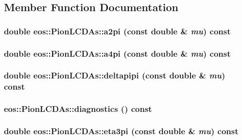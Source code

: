 \subsection{Member Function Documentation}
\hypertarget{classeos_1_1PionLCDAs_a4daa8e6632fb5ad61c13f7a7c4a91bbf}{
\subsubsection[{a2pi}]{\setlength{\rightskip}{0pt plus 5cm}double eos::PionLCDAs::a2pi (const double \& {\em mu}) const}}
\label{classeos_1_1PionLCDAs_a4daa8e6632fb5ad61c13f7a7c4a91bbf}
\hypertarget{classeos_1_1PionLCDAs_a0d0c446b70ca3078a36d064ffe5ae46c}{
\subsubsection[{a4pi}]{\setlength{\rightskip}{0pt plus 5cm}double eos::PionLCDAs::a4pi (const double \& {\em mu}) const}}
\label{classeos_1_1PionLCDAs_a0d0c446b70ca3078a36d064ffe5ae46c}
\hypertarget{classeos_1_1PionLCDAs_a605c4669795addc7a36752f6c07571e4}{
\subsubsection[{deltapipi}]{\setlength{\rightskip}{0pt plus 5cm}double eos::PionLCDAs::deltapipi (const double \& {\em mu}) const}}
\label{classeos_1_1PionLCDAs_a605c4669795addc7a36752f6c07571e4}
\hypertarget{classeos_1_1PionLCDAs_ae8727041baafa8c3007ef45a30f6d6ed}{
\subsubsection[{diagnostics}]{ eos::PionLCDAs::diagnostics () const}}
\label{classeos_1_1PionLCDAs_ae8727041baafa8c3007ef45a30f6d6ed}
\hypertarget{classeos_1_1PionLCDAs_a571ec82df903c4690aa2464a4ddd23a8}{
\subsubsection[{eta3pi}]{\setlength{\rightskip}{0pt plus 5cm}double eos::PionLCDAs::eta3pi (const double \& {\em mu}) const}}
